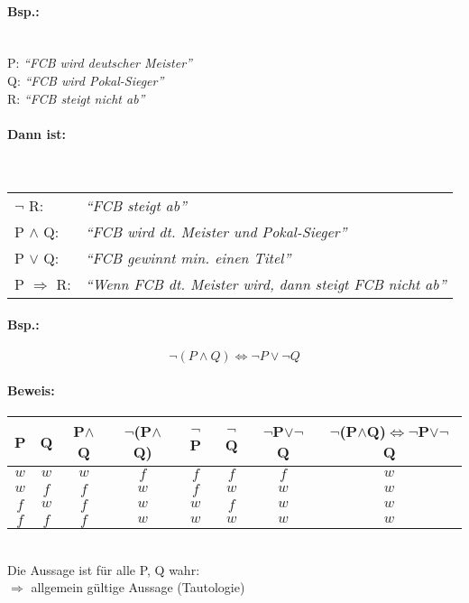 \documentclass[11pt,a4paper,oneside]{article}
\begin{document}
{\paragraph{Bsp.:}\mbox{}\\
  P: \emph{``FCB wird deutscher Meister''}\\
  Q: \emph{``FCB wird Pokal-Sieger''}\\
  R: \emph{``FCB steigt nicht ab''}

\paragraph{Dann ist:}\mbox{}\\
  \begin{tabular}{ll}
    $\neg$ R: & \emph{``FCB steigt ab''}\\
    P $\land$ Q: & \emph{``FCB wird dt. Meister und Pokal-Sieger''}\\
    P $\lor$ Q: & \emph{``FCB gewinnt min. einen Titel''}\\
    P $\Rightarrow$ R: & \emph{``Wenn FCB dt. Meister wird, dann steigt FCB nicht ab''}
  \end{tabular}

\paragraph{Bsp.:}
  \[\neg(P \land Q) \Leftrightarrow \neg P \lor \neg Q\]

\paragraph{Beweis:}
  \begin{center}
    \begin{tabular}{c | c | c | c | c | c | c | c}
      P & Q & P$\land$Q & $\neg$(P$\land$Q) & $\neg$P & $\neg$Q & $\neg$P$\lor\neg$Q & $\neg$(P$\land$Q)$\Leftrightarrow\neg$P$\lor\neg$Q \\
      \hline
      $w$ & $w$ & $w$ & $f$ & $f$ & $f$ & $f$ & $w$ \\
      $w$ & $f$ & $f$ & $w$ & $f$ & $w$ & $w$ & $w$ \\
      $f$ & $w$ & $f$ & $w$ & $w$ & $f$ & $w$ & $w$ \\
      $f$ & $f$ & $f$ & $w$ & $w$ & $w$ & $w$ & $w$ \\
    \end{tabular}
    \\[11pt]
    Die Aussage ist für alle P, Q wahr:\\
    $\Rightarrow$ allgemein gültige Aussage (Tautologie)
  \end{center}


}
\end{document}
